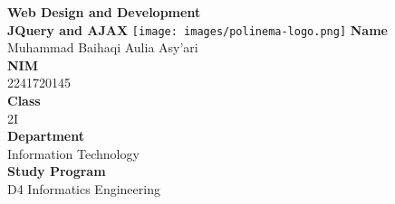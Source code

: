 \documentclass[12pt,titlepage]{article}
\newcommand{\vSubject}{Web Design and Development}
\newcommand{\vSubtitle}{JQuery and AJAX}
\newcommand{\vName}{Muhammad Baihaqi Aulia Asy'ari}
\newcommand{\vNIM}{2241720145}
\newcommand{\vClass}{2I}
\newcommand{\vDepartment}{Information Technology}
\newcommand{\vStudyProgram}{D4 Informatics Engineering}
\begin{document}
\begin{titlepage}
    \centering
    \vfill
    {\bfseries\LARGE
        \vSubject\\
        \vskip0.25cm
        \vSubtitle
    }
    \vfill
    \texttt{[image: images/polinema-logo.png]}
    \vfill
    {
        \textbf{Name}\\
        \vName\\
        \vskip0.5cm
        \textbf{NIM}\\
        \vNIM\\
        \vskip0.5cm
        \textbf{Class}\\
        \vClass\\
        \vskip0.5cm
        \textbf{Department}\\
        \vDepartment\\
        \vskip0.5cm
        \textbf{Study Program}\\
        \vStudyProgram
    }
\end{titlepage}

\newpage
\end{document}
